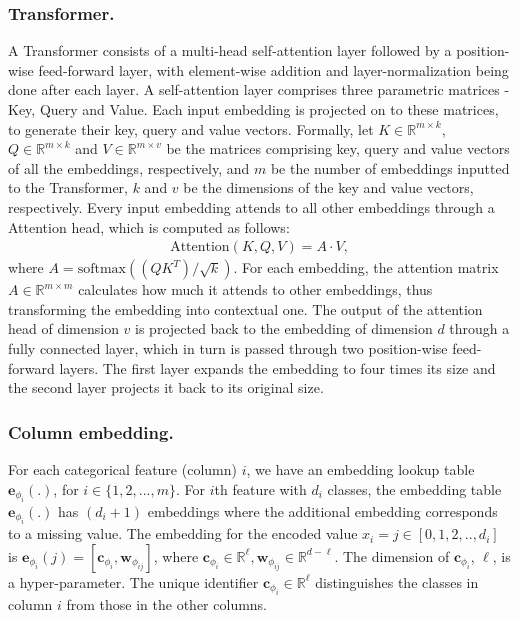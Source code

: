 \subsubsection{Transformer.} A Transformer \citep{vaswani2017attention} consists of a multi-head self-attention layer followed by a position-wise feed-forward layer, with element-wise addition and layer-normalization being done after each layer.
A self-attention layer comprises three parametric matrices - Key, Query and Value. Each input embedding is projected on to these matrices, to generate their key, query and value vectors. 
Formally, let $K \in \mathbb{R}^{m \times k}$, $Q \in \mathbb{R}^{m \times k}$ and $V \in \mathbb{R}^{m \times v}$ be the matrices comprising key, query and value vectors of all the embeddings, respectively, and $m$ be the number of embeddings inputted to the Transformer, $k$ and $v$ be the dimensions of the key and value vectors, respectively. Every input embedding attends to all other embeddings through a Attention head, which is computed as follows:
\begin{align}
    \text{Attention}(K, Q, V) = A \cdot V,  
\end{align}
where $A = \text{softmax}({(QK^T)}/{\sqrt{k}})$. For each embedding, the attention matrix $A \in \mathbb{R}^{m \times m}$ calculates how much it attends to other embeddings, thus transforming the embedding into contextual one. The output of the attention head of dimension $v$ is projected back to the embedding of dimension $d$ through a fully connected layer, which in turn is passed through two position-wise feed-forward layers. The first layer expands the embedding to four times its size and the second layer projects it back to its original size. 

\subsubsection{Column embedding.} For each categorical feature (column) $i$, we have an embedding lookup table $\bm{e}_{{\phi}_i}(.)$, for $i \in \{1,2,...,m\}$. For $i$th feature with $d_i$ classes, the embedding table $\bm{e}_{{\phi}_i}(.)$ has $(d_{i}+1)$ embeddings where the additional embedding corresponds to a missing value.
The embedding for the encoded value $x_i = j \in [0, 1, 2, .., d_i]$ is $\bm{e}_{{\phi}_i}(j) = [\bm{c}_{\phi_i}, \bm{w}_{\phi_{ij}}]$, where $\bm{c}_{\phi_i} \in \mathbb{R}^\ell, \bm{w}_{\phi_{ij}} \in \mathbb{R}^{d-\ell}$.
The dimension of $\bm{c}_{\phi_i}$, $\ell$, is a hyper-parameter. The unique identifier $\bm{c}_{\phi_i} \in \mathbb{R}^\ell$ distinguishes the classes in column $i$ from those in the other columns. 

